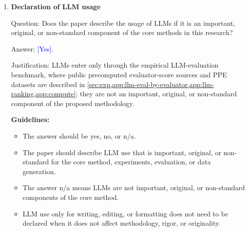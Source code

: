 \documentclass{article}
\theoremstyle{plain}
\theoremstyle{definition}
\newcommand{\1}{\mathbf{1}}
\providecommand{\answerYes}[1][]{\textcolor{blue}{[Yes]#1}}
\providecommand{\answerNA}[1][]{\textcolor{gray}{[N/A]#1}}
\begin{document}
\begin{enumerate}[leftmargin=5mm]
Answer: \answerNA{}.

Justification: The paper uses existing public benchmark data and does not
involve new crowdsourcing or human-subject research.

\textbf{Guidelines:}
\begin{itemize}[leftmargin=5mm, noitemsep]
\item The answer should be yes, no, or n/a.
\item IRB or equivalent review should be described when required by the
relevant institution or jurisdiction.
\item Initial submissions should not include information that breaks anonymity,
such as the reviewing institution, when applicable.
\end{itemize}

\item \textbf{Declaration of LLM usage}

Question: Does the paper describe the usage of LLMs if it is an important,
original, or non-standard component of the core methods in this research?

Answer: \answerYes{}.

Justification: LLMs enter only through the empirical LLM-evaluation benchmark,
where public precomputed evaluator-score sources and PPE datasets are described
in \cref{sec:exp,app:llm-eval-by-evaluator,app:llm-ranking,app:compute}; they
are not an important, original, or non-standard component of the proposed
methodology.

\textbf{Guidelines:}
\begin{itemize}[leftmargin=5mm, noitemsep]
\item The answer should be yes, no, or n/a.
\item The paper should describe LLM use that is important, original, or
non-standard for the core method, experiments, evaluation, or data generation.
\item The answer n/a means LLMs are not important, original, or non-standard
components of the core method.
\item LLM use only for writing, editing, or formatting does not need to be
declared when it does not affect methodology, rigor, or originality.
\end{itemize}
\end{enumerate}
\end{document}
